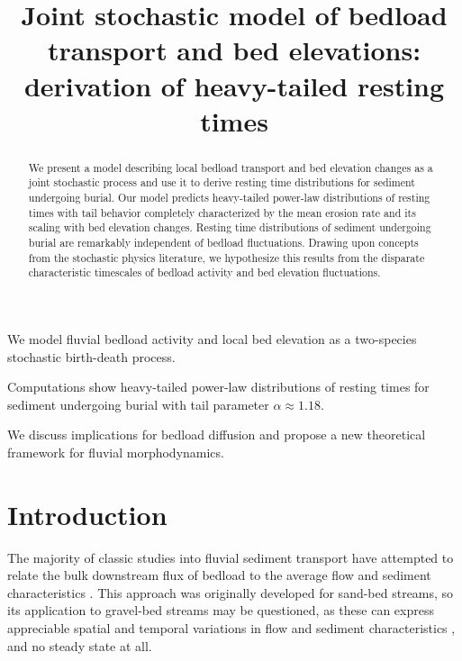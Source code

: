 \documentclass[draft]{agujournal2018}
\begin{document}
\title{Joint stochastic model of bedload transport and bed elevations: derivation of heavy-tailed resting times}

\begin{keypoints}
\item We model fluvial bedload activity and local bed elevation as a two-species stochastic birth-death process.
\item Computations show heavy-tailed power-law distributions of resting times for sediment undergoing burial with tail parameter $\alpha\approx 1.18$.
\item We discuss implications for bedload diffusion and propose a new theoretical framework for fluvial morphodynamics.

\end{keypoints}

\begin{abstract}
We present a model describing local bedload transport and bed elevation changes as a joint stochastic process and use it to derive resting time distributions for sediment undergoing burial.
Our model predicts heavy-tailed power-law distributions of resting times with tail behavior completely characterized by the mean erosion rate and its scaling with bed elevation changes.
Resting time distributions of sediment undergoing burial are remarkably independent of bedload fluctuations.
Drawing upon concepts from the stochastic physics literature, we hypothesize this results from the disparate characteristic timescales of bedload activity and bed elevation fluctuations.
\end{abstract} 

\section{Introduction}

The majority of classic studies into fluvial sediment transport have attempted to relate the bulk downstream flux of bedload to the average flow and sediment characteristics \citep[e.g.][]{Yalin1972}.
This approach was originally developed for sand-bed streams, so its application to gravel-bed streams may be questioned, as these can express appreciable spatial and temporal variations in flow and sediment characteristics \citep[e.g.][]{Hassan2013}, and
no steady state at all. 
\end{document}
